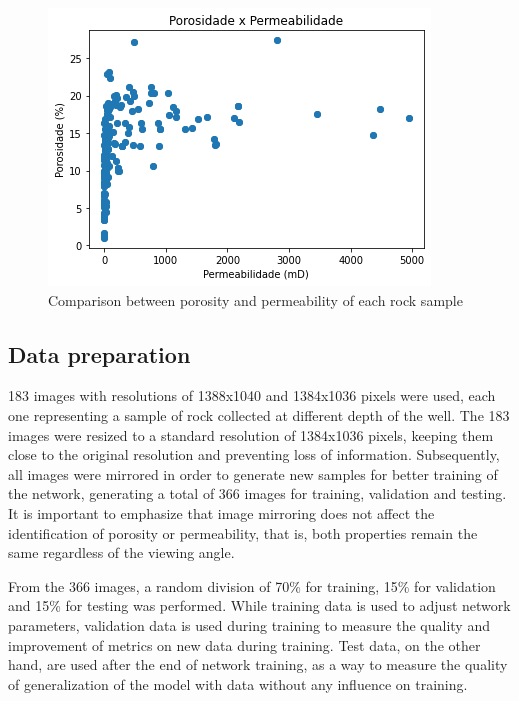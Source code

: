 \documentclass[a4paper,fleqn]{cas-sc}
\begin{document}
\begin{figure}[h!]
	\caption{Comparison between porosity and permeability of each rock sample}
	\label{fig:poroxperm}
	\centering%
	\begin{minipage}{0.5\textwidth}
		\includegraphics[width=\textwidth]{images/poroxperm.png}
	\end{minipage}
\end{figure}

\subsection{Data preparation}
183 images with resolutions of 1388x1040 and 1384x1036 pixels were used, each one representing a sample of rock collected at different depth of the well. The 183 images were resized to a standard resolution of 1384x1036 pixels, keeping them close to the original resolution and preventing loss of information. Subsequently, all images were mirrored in order to generate new samples for better training of the network, generating a total of 366 images for training, validation and testing. It is important to emphasize that image mirroring does not affect the identification of porosity or permeability, that is, both properties remain the same regardless of the viewing angle.

From the 366 images, a random division of 70\% for training, 15\% for validation and 15\% for testing was performed. While training data is used to adjust network parameters, validation data is used during training to measure the quality and improvement of metrics on new data during training. Test data, on the other hand, are used after the end of network training, as a way to measure the quality of generalization of the model with data without any influence on training.
\end{document}
